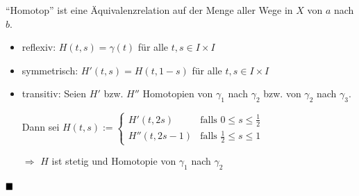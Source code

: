 \begin{korollar}
    \enquote{Homotop} ist eine Äquivalenzrelation auf der Menge aller
    Wege in $X$ von $a$ nach $b$.
\end{korollar}

\begin{beweis}\leavevmode
    \begin{itemize}
        \item reflexiv: $H(t,s) = \gamma(t)$ für alle $t,s \in I \times I$
        \item symmetrisch: $H'(t,s) = H(t,1-s)$ für alle $t,s \in I \times I$
        \item transitiv: Seien $H'$ bzw. $H''$ Homotopien von $\gamma_1$
              nach $\gamma_2$ bzw. von $\gamma_2$ nach $\gamma_3$.

              Dann sei $H(t,s) := \begin{cases}
              H'(t, 2s)    &\text{falls } 0 \leq s \leq \frac{1}{2}\\
              H''(t, 2s-1) &\text{falls } \frac{1}{2} \leq s \leq 1\end{cases}$

              $\Rightarrow$ $H$ ist stetig und Homotopie von $\gamma_1$ nach 
              $\gamma_2$
    \end{itemize}
    $\qed$
\end{beweis}

